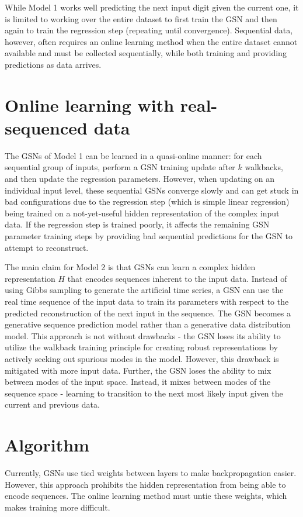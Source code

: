 While Model 1 works well predicting the next input digit given the current one, it is limited to working over the entire dataset to first train the GSN and then again to train the regression step (repeating until convergence). Sequential data, however, often requires an online learning method when the entire dataset cannot available and must be collected sequentially, while both training and providing predictions as data arrives.

\section{Online learning with real-sequenced data }
The GSNs of Model 1 can be learned in a quasi-online manner: for each sequential group of inputs, perform a GSN training update after \(k\) walkbacks, and then update the regression parameters. However, when updating on an individual input level, these sequential GSNs converge slowly and can get stuck in bad configurations due to the regression step (which is simple linear regression) being trained on a not-yet-useful hidden representation of the complex input data. If the regression step is trained poorly, it affects the remaining GSN parameter training steps by providing bad sequential predictions for the GSN to attempt to reconstruct.

The main claim for Model 2 is that GSNs can learn a complex hidden representation \(H\) that encodes sequences inherent to the input data. Instead of using Gibbs sampling to generate the artificial time series, a GSN can use the real time sequence of the input data to train its parameters with respect to the predicted reconstruction of the next input in the sequence. The GSN becomes a generative sequence prediction model rather than a generative data distribution model. This approach is not without drawbacks - the GSN loses its ability to utilize the walkback training principle for creating robust representations by actively seeking out spurious modes in the model. However, this drawback is mitigated with more input data.  Further, the GSN loses the ability to mix between modes of the input space. Instead, it mixes between modes of the sequence space - learning to transition to the next most likely input given the current and previous data.


\section{Algorithm}

Currently, GSNs use tied weights between layers to make backpropagation easier. However, this approach prohibits the hidden representation from being able to encode sequences. The online learning method must untie these weights, which makes training more difficult.


